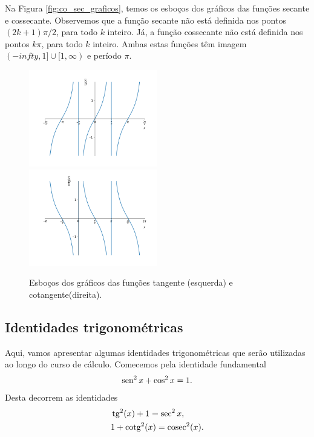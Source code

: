 Na Figura \ref{fig:co_sec_graficos}, temos os esboços dos gráficos das funções secante e cossecante. Observemos que a função secante não está definida nos pontos $(2k+1)\pi/2$, para todo $k$ inteiro. Já, a função cossecante não está definida nos pontos $k\pi$, para todo $k$ inteiro. Ambas estas funções têm imagem $(-infty, 1]\cup [1, \infty)$ e período $\pi$.

\begin{figure}[H]
  \centering
  \includegraphics[width=0.5\textwidth]{./cap_funcao/dados/fig_co_tg_graficos/fig_tg_grafico}~
  \includegraphics[width=0.5\textwidth]{./cap_funcao/dados/fig_co_tg_graficos/fig_cotg_grafico}
  \caption{Esboços dos gráficos das funções tangente (esquerda) e cotangente(direita).}
  \label{fig:co_tg_graficos}
\end{figure}

\subsection{Identidades trigonométricas}

Aqui, vamos apresentar algumas identidades trigonométricas que serão utilizadas ao longo do curso de cálculo. Comecemos pela identidade fundamental
\begin{equation}
  \operatorname{sen}^2 x + \cos^2 x = 1.
\end{equation}
Desta decorrem as identidades
\begin{align}
  &\operatorname{tg}^2(x) + 1 = \sec^2 x,\\
  &1 + \operatorname{cotg}^2(x) = \operatorname{cosec}^2(x).
\end{align}

